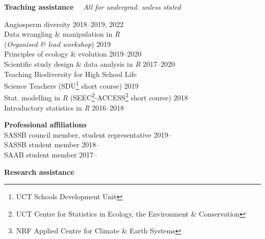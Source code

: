 \documentclass[10pt]{article}
\begin{document}
\begin{multicols}{2}
\columnbreak

\textbf{Teaching assistance} %
  ~~{\small \textmd{\textit{All for undergrad. unless stated}}}

Angiosperm diversity                         \hfill {\small 2018--2019, 2022} \\
Data wrangling \& manipulation in \textit{R}                                  \\
\hspace{2em} (\textit{Organised \& lead
  workshop})                                 \hfill {\small             2019} \\
Principles of ecology \& evolution           \hfill {\small       2019--2020} \\
Scientific study design \& data analysis in
  \textit{R}                                 \hfill {\small       2017--2020} \\
Teaching Biodiversity for High School Life                                    \\
\hspace{2em} Science Teachers {\small
  (SDU\footnote{UCT Schools Development Unit}
  short course)}                             \hfill {\small             2019} \\
Stat. modelling in \textit{R} {\small
  (SEEC\footnote{UCT Centre for Statistics in
  Ecology, the Environment \&
  Conservation}-ACCESS\footnote{NRF Applied
  Centre for Climate \& Earth Systems} short
  course)}                                   \hfill {\small             2018} \\
Introductory statistics in \textit{R}        \hfill {\small       2016--2018}

\textbf{Professional affiliations}\\ %

SASSB council member, student representative           \hfill {\small 2019--} \\
SASSB student member                                   \hfill {\small 2018--} \\
SAAB student member                                    \hfill {\small 2017--}

\end{multicols}

\textbf{Research assistance} %
\end{document}
